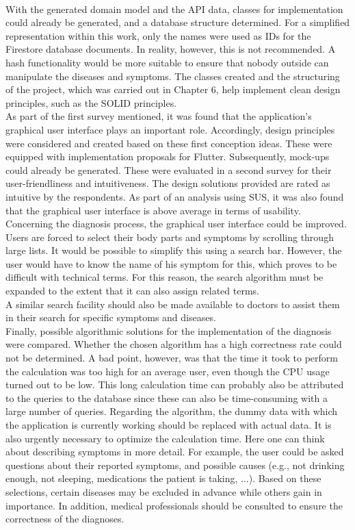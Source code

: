 \newline \\
With the generated domain model and the API data, classes for implementation could already be generated, and a database structure determined. For a simplified representation within this work, only the names were used as IDs for the Firestore database documents. In reality, however, this is not recommended. A hash functionality would be more suitable to ensure that nobody outside can manipulate the diseases and symptoms. The classes created and the structuring of the project, which was carried out in Chapter 6, help implement clean design principles, such as the SOLID principles.
\newline \\
As part of the first survey mentioned, it was found that the application's graphical user interface plays an important role. Accordingly, design principles were considered and created based on these first conception ideas. These were equipped with implementation proposals for Flutter. Subsequently, mock-ups could already be generated. These were evaluated in a second survey for their user-friendliness and intuitiveness. The design solutions provided are rated as intuitive by the respondents. As part of an analysis using SUS, it was also found that the graphical user interface is above average in terms of usability. Concerning the diagnosis process, the graphical user interface could be improved. Users are forced to select their body parts and symptoms by scrolling through large lists. It would be possible to simplify this using a search bar. However, the user would have to know the name of his symptom for this, which proves to be difficult with technical terms. For this reason, the search algorithm must be expanded to the extent that it can also assign related terms.
\newline \\
A similar search facility should also be made available to doctors to assist them in their search for specific symptoms and diseases.
\newline \\
Finally, possible algorithmic solutions for the implementation of the diagnosis were compared. Whether the chosen algorithm has a high correctness rate could not be determined. A bad point, however, was that the time it took to perform the calculation was too high for an average user, even though the CPU usage turned out to be low. This long calculation time can probably also be attributed to the queries to the database since these can also be time-consuming with a large number of queries. Regarding the algorithm, the dummy data with which the application is currently working should be replaced with actual data. It is also urgently necessary to optimize the calculation time. Here one can think about describing symptoms in more detail. For example, the user could be asked questions about their reported symptoms, and possible causes (e.g., not drinking enough, not sleeping, medications the patient is taking, ...). Based on these selections, certain diseases may be excluded in advance while others gain in importance. In addition, medical professionals should be consulted to ensure the correctness of the diagnoses. 
